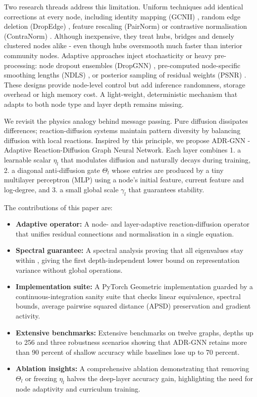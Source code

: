 \documentclass{article}
\begin{document}
Two research threads address this limitation. Uniform techniques add identical corrections at every node, including identity mapping (GCNII) \cite{chen-2020-simple}, random edge deletion (DropEdge) \cite{rong-2019-dropedge}, feature rescaling (PairNorm) \cite{zhao-2019-pairnorm} or contrastive normalisation (ContraNorm) \cite{guo-2023-contranorm}. Although inexpensive, they treat hubs, bridges and densely clustered nodes alike - even though hubs oversmooth much faster than interior community nodes. Adaptive approaches inject stochasticity or heavy pre-processing: node dropout ensembles (DropGNN) \cite{papp-2021-dropgnn}, pre-computed node-specific smoothing lengths (NDLS) \cite{zhang-2021-node}, or posterior sampling of residual weights (PSNR) \cite{zhou-2023-deep}. These designs provide node-level control but add inference randomness, storage overhead or high memory cost. A light-weight, deterministic mechanism that adapts to both node type and layer depth remains missing.

We revisit the physics analogy behind message passing. Pure diffusion dissipates differences; reaction-diffusion systems maintain pattern diversity by balancing diffusion with local reactions. Inspired by this principle, we propose ADR-GNN - Adaptive Reaction-Diffusion Graph Neural Network. Each layer combines
1. a learnable scalar \(\eta_l\) that modulates diffusion and naturally decays during training,
2. a diagonal anti-diffusion gate \(\Theta_l\) whose entries are produced by a tiny multilayer perceptron (MLP) using a node’s initial feature, current feature and log-degree, and
3. a small global scale \(\gamma_l\) that guarantees stability.

The contributions of this paper are:
\begin{itemize}
  \item \textbf{Adaptive operator:} A node- and layer-adaptive reaction-diffusion operator that unifies residual connections and normalisation in a single equation.
  \item \textbf{Spectral guarantee:} A spectral analysis proving that all eigenvalues stay within , giving the first depth-independent lower bound on representation variance without global operations.
  \item \textbf{Implementation suite:} A PyTorch Geometric implementation guarded by a continuous-integration sanity suite that checks linear equivalence, spectral bounds, average pairwise squared distance (APSD) preservation and gradient activity.
  \item \textbf{Extensive benchmarks:} Extensive benchmarks on twelve graphs, depths up to 256 and three robustness scenarios showing that ADR-GNN retains more than 90 percent of shallow accuracy while baselines lose up to 70 percent.
  \item \textbf{Ablation insights:} A comprehensive ablation demonstrating that removing \(\Theta_l\) or freezing \(\eta_l\) halves the deep-layer accuracy gain, highlighting the need for node adaptivity and curriculum training.
\end{itemize}
\end{document}
